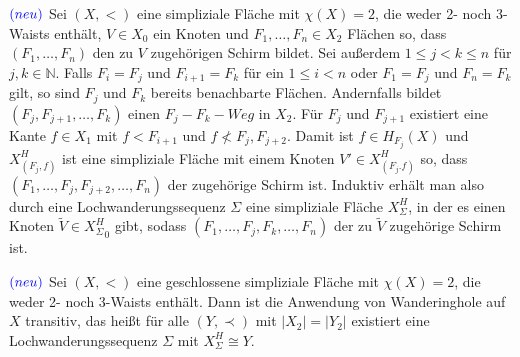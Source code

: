 \documentclass[12pt,titlepage]{article}
\begin{document}
\begin{vor} \label{vor2} $\textcolor{blue}{(neu)}$ 
Sei $(X,<)$ eine simpliziale Fläche mit $\chi(X)=2$, die weder 2- noch 3-Waists enthält, $V\in X_0$ ein Knoten und $F_1,\ldots,F_n \in X_2$ Flächen so, dass $(F_1,\ldots,F_n)$ den zu $V$ zugehörigen Schirm bildet. Sei außerdem $1 \leq j<k\leq n$ für $j,k \in \mathbb{N}$. Falls $F_i=F_j$ und $F_{i+1}=F_k$ für ein $1 \leq i < n$ oder $F_1=F_j$ und $F_n=F_k$ gilt, so sind $F_j$ und $F_k$ bereits benachbarte Flächen. Andernfalls bildet $(F_j,F_{j+1},\ldots,F_k)$ einen $F_j-F_k-Weg$ in $X_2$. Für $F_j$ und $F_{j+1}$ existiert eine Kante $f \in X_1$ mit $f<F_{i+1}$ und $f \nless F_j,F_{j+2}$. Damit ist $f \in H_{F_j}(X)$ und $X^H_{(F_j,f)}$ ist eine simpliziale Fläche mit einem Knoten $V'\in X^H_{(F_j.f)}$ so, dass $(F_1,\ldots,F_j,F_{j+2},\ldots,F_n)$ der zugehörige Schirm ist. Induktiv erhält man also durch eine Lochwanderungssequenz $\Sigma$ eine simpliziale Fläche $X_{\Sigma}^H$, in der es einen Knoten $\tilde{V} \in {X_{\Sigma}^H}_0$ gibt, sodass $(F_1,\ldots,F_j,F_k,\ldots,F_n)$ der zu $\tilde{V}$ zugehörige Schirm ist. 
\end{vor}
\begin{satz}$\textcolor{blue}{(neu)}$
Sei $(X,<)$ eine geschlossene simpliziale Fläche mit $\chi (X)=2$, die weder 2- noch 3-Waists enthält. Dann ist die Anwendung von Wanderinghole auf $X$ transitiv, das heißt für alle $(Y,\prec)$ mit $\vert X_2 \vert = \vert Y_2 \vert$ existiert eine Lochwanderungssequenz $\Sigma$ mit $X^H_{\Sigma} \cong Y$.
\end{satz}
\end{document}
